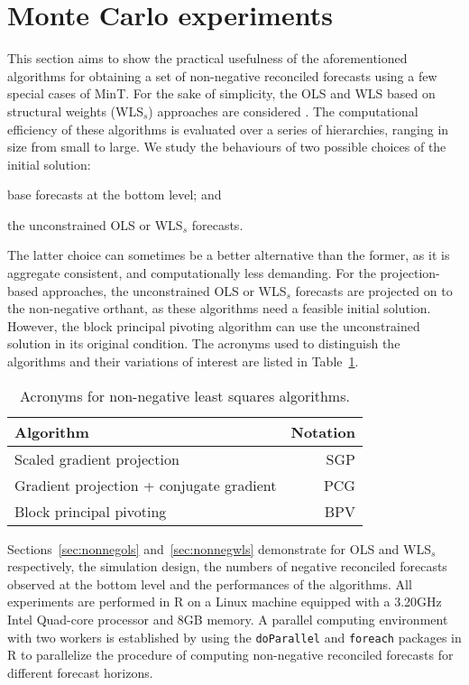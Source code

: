\documentclass[11pt]{article}
\newcommand{\0}{\phantom{0}}
\begin{document}
\section{Monte Carlo experiments}
\label{sec:MCNN}

This section aims to show the practical usefulness of the aforementioned algorithms for obtaining a set of non-negative reconciled forecasts using a few special cases of MinT. For the sake of simplicity, the OLS and WLS based on structural weights (WLS$_{s}$) approaches are considered \citep{Wick2018}. The computational efficiency of these algorithms is evaluated over a series of hierarchies, ranging in size from small to large. We study the behaviours of two possible choices of the initial solution: \begin{inparaenum}[(i)] \item base forecasts at the bottom level; and \item the unconstrained OLS or WLS$_{s}$ forecasts. \end{inparaenum} The latter choice can sometimes be a better alternative than the former, as it is aggregate consistent, and computationally less demanding. For the projection-based approaches, the unconstrained OLS or WLS$_{s}$ forecasts are projected on to the non-negative orthant, as these algorithms need a feasible initial solution. However, the block principal pivoting algorithm can use the unconstrained solution in its original condition. The acronyms used to distinguish the algorithms and their variations of interest are listed in Table~\ref{tbl:acronn}.

\begin{table}[ht]
	\centering

	\caption{Acronyms for non-negative least squares algorithms.}
	\label{tbl:acronn}
		\begin{tabular}{lr}
			\toprule
			Algorithm & Notation \\
			\midrule
			Scaled gradient projection & SGP\\[0.1cm]
			Gradient projection + conjugate gradient & PCG \\[0.1cm]
			Block principal pivoting & BPV \\
			\bottomrule
		\end{tabular}
\end{table}

Sections~\ref{sec:nonnegols} and~\ref{sec:nonnegwls} demonstrate for OLS and WLS$_{s}$ respectively, the simulation design, the numbers of negative reconciled forecasts observed at the bottom level and the performances of the algorithms. All experiments are performed in R on a Linux machine equipped with a 3.20GHz Intel Quad-core processor and 8GB memory. A parallel computing environment with two workers is established by using the \texttt{doParallel} \citep{doparallel2015} and \texttt{foreach} \citep{foreach2015} packages in R to parallelize the procedure of computing non-negative reconciled forecasts for different forecast horizons.
\end{document}
